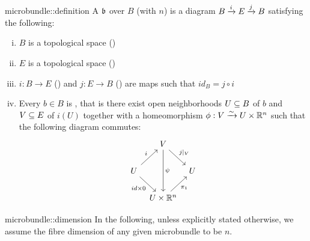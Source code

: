 \begin{mydefinition}[microbundle]{microbundle::definition}{}
    A  $\bb$ over $B$ (with  $n$)
    is a diagram $\bundle{B}{E}{i}{j}$ satisfying the following:
    \begin{enumerate}[(i)]
        \item $B$ is a topological space ()
        \item $E$ is a topological space ()
        \item $i: B \to E$ () and $j: E \to B$ ()
        are maps such that $id_B = j \circ i$
        \item Every $b \in B$ is ,
        that is there exist open neighborhoods $U \sub B$ of $b$ and $V \sub E$ of $i(U)$
        together with a homeomorphism $\phi: V \isomto U \times \R^n$ such that the following diagram commutes:
        \[
            \begin{tikzcd}[column sep=tiny]
                & V \ar[dr, "j\vert_V"] \ar[dd, "\psi"] & \\
                U \ar[ur, "i"] \ar[dr, "{id \times 0}"'] & & U \\
                & U \times\R^n \ar[ur, "\pi_1"'] &
            \end{tikzcd}
        \]
    \end{enumerate}
\end{mydefinition}

\begin{myremark}{microbundle::dimension}{}
    In the following, unless explicitly stated otherwise,
    we assume the fibre dimension of any given microbundle to be $n$.
\end{myremark}